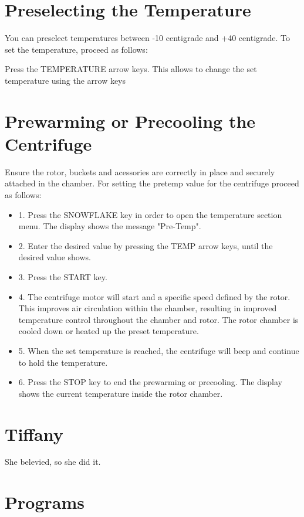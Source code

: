 \documentclass[12pt]{../SOP3_beta}
\begin{document}
\section{Preselecting the Temperature}

\NP You can preselect temperatures between -10 centigrade and +40 centigrade. To set the temperature, proceed as follows:

\NP Press the TEMPERATURE arrow keys. This allows to change the set temperature using the arrow keys 

\section{Prewarming or Precooling the Centrifuge}

\NP Ensure the rotor, buckets and acessories are correctly in place and securely attached in the chamber. For setting the pretemp value for the centrifuge proceed as follows: 

\begin{itemize}
  \item 1. Press the SNOWFLAKE key in order to open the temperature section menu. The display shows the message "Pre-Temp".
  \item 2. Enter the desired value by pressing the TEMP arrow keys, until the desired value shows.
  \item 3. Press the START key.
  \item 4. The centrifuge motor will start and a specific speed defined by the rotor. This improves air circulation within the chamber, resulting in improved temperature control throughout the chamber and rotor. The rotor chamber is cooled down or heated up the preset temperature. 
  \item 5. When the set temperature is reached, the centrifuge will beep and continue to hold the temperature.  
  \item 6. Press the STOP key to end the prewarming or precooling. The display shows the current temperature inside the rotor chamber. 
\end{itemize}

\section{Tiffany}
\NP She belevied, so she did it. 

\section{Programs}
\end{document}
